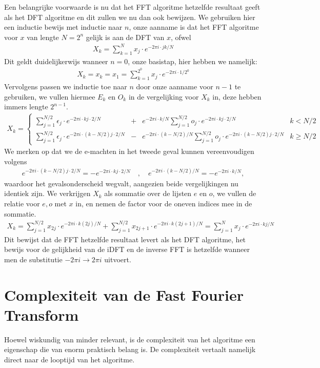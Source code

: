 \documentclass[11pt]{amsart}
\newcommand{\e}{\epsilon}
\newcommand{\eq}[1]{\begin{eqnarray*} #1 \end{eqnarray*}}
\begin{document}
Een belangrijke voorwaarde is nu dat het FFT algoritme hetzelfde resultaat geeft als het DFT algoritme en dit zullen we nu dan ook bewijzen. We gebruiken hier een inductie bewijs met inductie naar $n$, onze aanname is dat het FFT algoritme voor $x$ van lengte $N=2^n$ gelijk is aan de DFT van $x$, ofwel
\eq{
  X_k = \sum^{N}_{k=1} x_j \cdot e^{-2\pi i \cdot jk/N}
}
Dit geldt duidelijkerwijs wanneer $n=0$, onze basistap, hier hebben we namelijk:
\eq{
  X_k = x_k = x_1 = \sum^{2^0}_{k=1} x_j \cdot e^{-2\pi i \cdot 1/2^0}
}
Vervolgens passen we inductie toe naar $n$ door onze aanname voor $n-1$ te gebruiken,
we vullen hiermee $E_k$ en $O_k$ in de vergelijking voor $X_k$ in, deze hebben immers lengte $2^{n-1}$.
\eq{
  X_k = \left\{\begin{array}{llll}
    \sum^{N/2}_{j=1} \e_j \cdot e^{-2\pi i \cdot kj \cdot 2/N} &+& 
    e^{-2\pi i \cdot k/N}
    \sum^{N/2}_{j=1} o_j \cdot e^{-2\pi i\cdot kj \cdot 2/N} &  k< N/2 \\
    \sum^{N/2}_{j=1} \e_j \cdot e^{-2\pi i\cdot (k-N/2) j\cdot 2/N} &-& 
    e^{-2\pi i\cdot (k-N/2)/N}
    \sum^{N/2}_{j=1} o_j \cdot e^{-2\pi i\cdot (k-N/2)j\cdot 2/N} &  k\geq N/2 
  \end{array}\right.
}
We merken op dat we de e-machten in het tweede geval kunnen vereenvoudigen volgens
\eq{
  e^{-2\pi i\cdot (k-N/2)j \cdot 2/N} = - e^{-2\pi i\cdot kj\cdot 2/N} \quad,\quad e^{-2\pi i\cdot(k-N/2)/N} = -e^{-2\pi i\cdot k/N},
}
waardoor het gevalsonderscheid wegvalt, aangezien beide vergelijkingen nu identiek zijn.
We verkrijgen $X_k$ als sommatie over de lijsten $e$ en $o$, we vullen de relatie voor $e,o$ met $x$ in, en nemen de factor voor de oneven indices mee in de sommatie.
\eq{
  X_k = \sum^{N/2}_{j=1} x_{2j} \cdot e^{-2\pi i\cdot k (2j)/N} + 
    \sum^{N/2}_{j=1} x_{2j+1} \cdot e^{-2\pi i\cdot k (2j+1)/N} 
    = \sum^N_{j=1} x_j \cdot e^{-2\pi i\cdot k j/N}
}
Dit bewijst dat de FFT hetzelfde resultaat levert als het DFT algoritme, het bewijs voor de gelijkheid van de iDFT en de inverse FFT is 
hetzelfde wanneer men de substitutie $-2\pi i \rightarrow 2\pi i$ uitvoert.

\section{Complexiteit van de Fast Fourier Transform}
Hoewel wiskundig van minder relevant, is de complexiteit van het algoritme een eigenschap die van enorm praktisch belang is. De complexiteit vertaalt namelijk direct naar de looptijd van het algoritme.\bigskip
\end{document}
